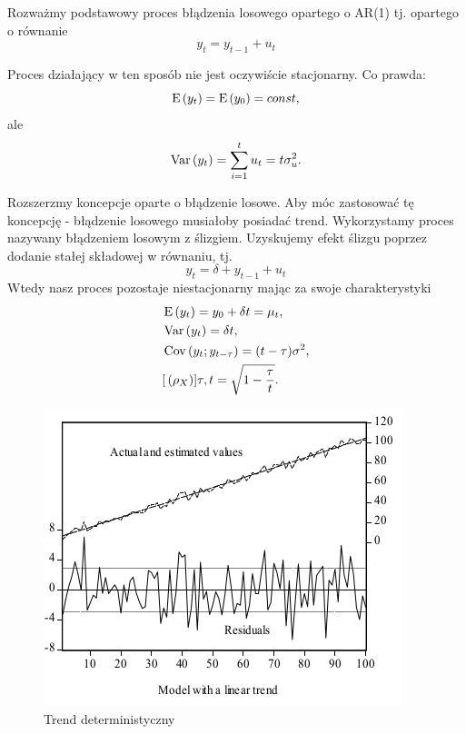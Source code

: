 \documentclass[10pt,a4paper]{book}
\begin{document}
Rozważmy podstawowy proces błądzenia losowego opartego o AR(1) tj. opartego o równanie
$$
y_t = y_{t-1} + u_t
$$

Proces działający w ten sposób nie jest oczywiście stacjonarny. Co prawda:
$$
\operatorname{E} \left({y_t} \right) = \operatorname{E} \left({y_0} \right) = const,
$$
ale
$$
\Variance{y_t} = \sum_{i=1}^{t} u_t = t \sigma^2_u.
$$

Rozszerzmy koncepcje oparte o błądzenie losowe. Aby móc zastosować tę koncepcję - błądzenie losowego musiałoby posiadać trend. Wykorzystamy proces nazywany błądzeniem losowym z ślizgiem. Uzyskujemy efekt ślizgu poprzez dodanie stałej składowej w równaniu, tj. 
$$
y_t = \delta + y_{t-1} + u_t
$$
Wtedy nasz proces pozostaje niestacjonarny mając za swoje charakterystyki
\begin{align*}
& \operatorname{E} \left({y_t} \right)= y_0 + \delta t = \mu_t, \\
& \operatorname{Var} \left( {y_t} \right) = \delta t , \\
& \operatorname{Cov} \left( {y_t};{y_{t-\tau}} \right)= (t-\tau) \sigma^2, \\
& {{[}\left( {\rho_X} \right)}]{\tau,t} = \sqrt{1 - \frac{\tau}{t}}.
\end{align*}

\begin{figure}
\centering
\includegraphics[scale=1]{images/deterministic_trend_residuas.png}
\caption{Trend deterministyczny}
\label{figure-deterministic-trend}
\end{figure}
\end{document}
